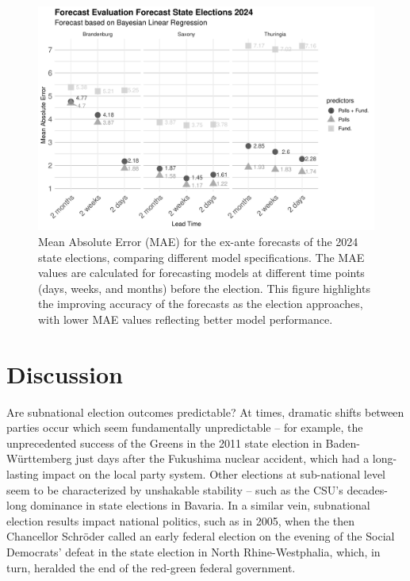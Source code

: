 \documentclass[doublespaced,12pt]{article}
\begin{document}
\begin{doublespacing}
\begin{figure}
    \centering
    \includegraphics[width=\textwidth]{fg6_forecast_evaluation_mae.pdf}
    \caption{Mean Absolute Error (MAE) for the ex-ante forecasts of the 2024 state elections, comparing different model specifications. The MAE values are calculated for forecasting models at different time points (days, weeks, and months) before the election. This figure highlights the improving accuracy of the forecasts as the election approaches, with lower MAE values reflecting better model performance.}
    \label{fig:forecast-evaluation-mae}
\end{figure}

\FloatBarrier
\section{Discussion}

Are subnational election outcomes predictable? At times, dramatic shifts between parties occur which seem fundamentally unpredictable -- for example, the unprecedented success of the Greens in the 2011 state election in Baden-Württemberg just days after the Fukushima nuclear accident, which had a long-lasting impact on the local party system. Other elections at sub-national level seem to be characterized by unshakable stability -- such as the CSU's decades-long dominance in state elections in Bavaria. In a similar vein, subnational election results impact national politics, such as in 2005, when the then Chancellor Schröder called an early federal election on the evening of the Social Democrats' defeat in the state election in North Rhine-Westphalia, which, in turn, heralded the end of the red-green federal government. 


\end{doublespacing}
\end{document}
